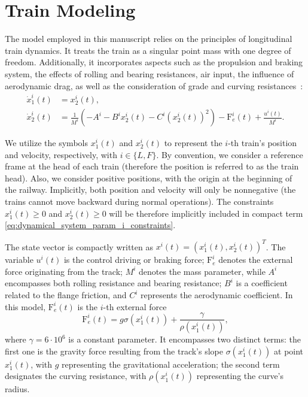 \section{Train Modeling}
\label{sec:TrainModeling}

The model employed in this manuscript relies on the principles of longitudinal train dynamics. It treats the train as a singular point mass with one degree of freedom. Additionally, it incorporates aspects such as the propulsion and braking system, the effects of rolling and bearing resistances, air input, the influence of aerodynamic drag, as well as the consideration of grade and curving resistances~\cite{ltdModel}:
%
\begin{align}  \label{eq:stateDynamic}
	\dot{x}_1^i (t) &= x_2^i(t),  \nonumber \\
	\dot{x}_2^i(t) &= \frac{1}{M^i}(-A^i-B^i x_2^i(t) -  C^i (x_2^i(t))^2)-\mathrm{F}_e^i(t) + \frac{u^i(t)}{M^i}.
\end{align}
%

We utilize the symbols ${x}_1^i(t)$ and ${x}_2^i(t)$ to represent the $i$-th train's position and velocity, respectively, with $i\in\{L, F\}$. By convention, we consider a reference frame at the head of each train (therefore the position is referred to as the train head). 
Also, we consider positive positions, with the origin at the beginning of the railway. Implicitly, both position and velocity will only be nonnegative (the trains cannot move backward during normal operations). The constraints ${x}_1^i(t)\geq 0$ and ${x}_2^i(t)\geq 0$ will be therefore implicitly included in compact term \eqref{eq:dynamical_system_param_i_constraints}.

The state vector is compactly written as {$x^i(t)=(x_1^i(t),x_2^i(t))^T$}.
The variable $u^i(t)$ is the control driving or braking force; $\mathrm{F}_e^i$ denotes the external force originating from the track; $M^i$ denotes the mass parameter, while $A^i$ encompasses both rolling resistance and bearing resistance; $B^i$ is a coefficient related to the flange friction, and $C^i$ represents the aerodynamic coefficient.
%
In this model, $\mathrm{F}^i_e(t)$ is the $i$-th external force
%
\begin{equation*}
	\mathrm{F}_e^i(t) = g \sigma(x_1^i(t)) + \frac{\gamma}{\rho(x_1^i(t))}, 
\end{equation*}
%
where $\gamma=6\cdot10^6$ is a constant parameter. It encompasses two distinct terms: the first one is the gravity force resulting from the track's slope $\sigma(x_1^i(t))$  at point $x_1^i(t)$, with $g$ representing the gravitational acceleration; the second term designates the curving resistance, with ${\rho(x_1^i(t))}$ representing the curve's radius.

